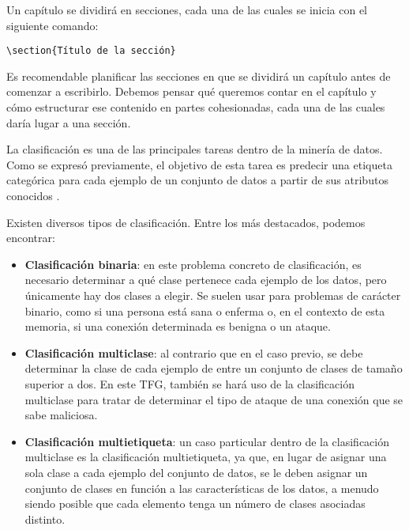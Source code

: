 Un capítulo se dividirá en secciones, cada una de las cuales se inicia con el siguiente comando:

\begin{verbatim}
\section{Título de la sección}
\end{verbatim}

Es recomendable planificar las secciones en que se dividirá un capítulo antes de comenzar a escribirlo. Debemos pensar qué queremos contar en el capítulo y cómo estructurar ese contenido en partes cohesionadas, cada una de las cuales daría lugar a una sección.

La clasificación es una de las principales tareas dentro de la minería de datos.
Como se expresó previamente, el objetivo de esta tarea es predecir una etiqueta categórica para cada ejemplo de un conjunto de datos a partir de sus atributos conocidos \cite{hastie2009elements}.

Existen diversos tipos de clasificación. Entre los más destacados, podemos encontrar:

\begin{itemize}
    \item\textbf{Clasificación binaria}: en este problema concreto de clasificación, es necesario determinar a qué clase pertenece cada ejemplo de los datos, pero únicamente hay dos clases a elegir. Se suelen usar para problemas de carácter binario, como si una persona está sana o enferma o, en el contexto de esta memoria, si una conexión determinada es benigna o un ataque.
    
    \item\textbf{Clasificación multiclase}: al contrario que en el caso previo, se debe determinar la clase de cada ejemplo de entre un conjunto de clases de tamaño superior a dos. En este TFG, también se hará uso de la clasificación multiclase para tratar de determinar el tipo de ataque de una conexión que se sabe maliciosa.
    
    \item\textbf{Clasificación multietiqueta}: un caso particular dentro de la clasificación multiclase es la clasificación multietiqueta, ya que, en lugar de asignar una sola clase a cada ejemplo del conjunto de datos, se le deben asignar un conjunto de clases en función a las características de los datos, a menudo siendo posible que cada elemento tenga un número de clases asociadas distinto.

\end{itemize}

